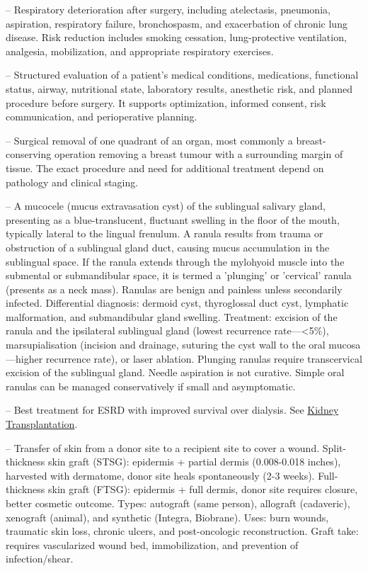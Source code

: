 -- Respiratory deterioration after surgery, including atelectasis, pneumonia, aspiration, respiratory failure, bronchospasm, and exacerbation of chronic lung disease. Risk reduction includes smoking cessation, lung-protective ventilation, analgesia, mobilization, and appropriate respiratory exercises.

-- Structured evaluation of a patient’s medical conditions, medications, functional status, airway, nutritional state, laboratory results, anesthetic risk, and planned procedure before surgery. It supports optimization, informed consent, risk communication, and perioperative planning.

-- Surgical removal of one quadrant of an organ, most commonly a breast-conserving operation removing a breast tumour with a surrounding margin of tissue. The exact procedure and need for additional treatment depend on pathology and clinical staging.

-- A mucocele (mucus extravasation cyst) of the sublingual salivary gland, presenting as a blue-translucent, fluctuant swelling in the floor of the mouth, typically lateral to the lingual frenulum. A ranula results from trauma or obstruction of a sublingual gland duct, causing mucus accumulation in the sublingual space. If the ranula extends through the mylohyoid muscle into the submental or submandibular space, it is termed a 'plunging' or 'cervical' ranula (presents as a neck mass). Ranulas are benign and painless unless secondarily infected. Differential diagnosis: dermoid cyst, thyroglossal duct cyst, lymphatic malformation, and submandibular gland swelling. Treatment: excision of the ranula and the ipsilateral sublingual gland (lowest recurrence rate—<5\%), marsupialisation (incision and drainage, suturing the cyst wall to the oral mucosa—higher recurrence rate), or laser ablation. Plunging ranulas require transcervical excision of the sublingual gland. Needle aspiration is not curative. Simple oral ranulas can be managed conservatively if small and asymptomatic.

-- Best treatment for ESRD with improved survival over dialysis. See \hyperlink{Kidney Transplantation}{Kidney Transplantation}.

-- Transfer of skin from a donor site to a recipient site to cover a wound. Split-thickness skin graft (STSG): epidermis + partial dermis (0.008-0.018 inches), harvested with dermatome, donor site heals spontaneously (2-3 weeks). Full-thickness skin graft (FTSG): epidermis + full dermis, donor site requires closure, better cosmetic outcome. Types: autograft (same person), allograft (cadaveric), xenograft (animal), and synthetic (Integra, Biobrane). Uses: burn wounds, traumatic skin loss, chronic ulcers, and post-oncologic reconstruction. Graft take: requires vascularized wound bed, immobilization, and prevention of infection/shear.

